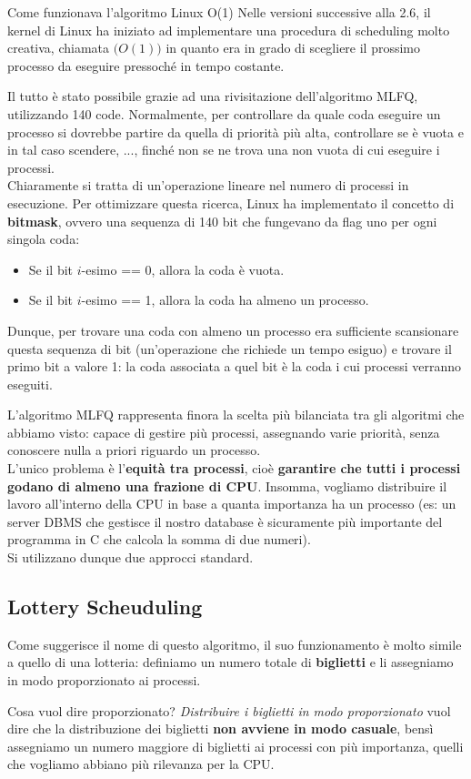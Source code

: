 \documentclass[12pt]{report}
\begin{document}
	\begin{esempio}{Come funzionava l'algoritmo Linux O(1)}{}
		Nelle versioni successive alla 2.6, il kernel di Linux ha iniziato ad implementare una procedura di scheduling molto creativa, chiamata $\bm(O(1))$ in quanto era in grado di scegliere il prossimo processo da eseguire pressoché in tempo costante.
		\smallbreak
		
		Il tutto è stato possibile grazie ad una rivisitazione dell'algoritmo MLFQ, utilizzando 140 code. Normalmente, per controllare da quale coda eseguire un processo si dovrebbe partire da quella di priorità più alta, controllare se è vuota e in tal caso scendere, ..., finché non se ne trova una non vuota di cui eseguire i processi.\\
		Chiaramente si tratta di un'operazione lineare nel numero di processi in esecuzione. Per ottimizzare questa ricerca, Linux ha implementato il concetto di \textbf{bitmask}, ovvero una sequenza di 140 bit che fungevano da flag uno per ogni singola coda:
		\begin{itemize}
			\item Se il bit $i$-esimo == 0, allora la coda è vuota.
			
			\item Se il bit $i$-esimo == 1, allora la coda ha almeno un processo.
		\end{itemize}
		Dunque, per trovare una coda con almeno un processo era sufficiente scansionare questa sequenza di bit (un'operazione che richiede un tempo esiguo) e trovare il primo bit a valore 1: la coda associata a quel bit è la coda i cui processi verranno eseguiti.
	\end{esempio}
	
	L'algoritmo MLFQ rappresenta finora la scelta più bilanciata tra gli algoritmi che abbiamo visto: capace di gestire più processi, assegnando varie priorità, senza conoscere nulla a priori riguardo un processo.\\
	L'unico problema è l'\textbf{equità tra processi}, cioè \textbf{garantire che tutti i processi godano di almeno una frazione di CPU}. Insomma, vogliamo distribuire il lavoro all'interno della CPU in base a quanta importanza ha un processo (es: un server DBMS che gestisce il nostro database è sicuramente più importante del programma in C che calcola la somma di due numeri).\\
	Si utilizzano dunque due approcci standard.
	
	\subsection{Lottery Scheuduling}
	Come suggerisce il nome di questo algoritmo, il suo funzionamento è molto simile a quello di una lotteria: definiamo un numero totale di \textbf{biglietti} e li assegniamo in modo proporzionato ai processi.
	\begin{osservazione}{Cosa vuol dire proporzionato?}{}
		\textit{Distribuire i biglietti in modo proporzionato} vuol dire che la distribuzione dei biglietti \textbf{non avviene in modo casuale}, bensì assegniamo un numero maggiore di biglietti ai processi con più importanza, quelli che vogliamo abbiano più rilevanza per la CPU.
	\end{osservazione}
	
\end{document}
